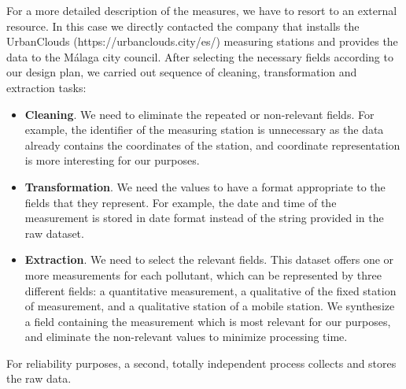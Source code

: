 For a more detailed description of the measures, we have to resort to an external resource.
In this case we directly contacted the company that installs the UrbanClouds (https://urbanclouds.city/es/) measuring stations and provides the data to the Málaga city council.
After selecting the necessary fields according to our design plan, we carried out sequence of cleaning, transformation and extraction tasks:

\begin{itemize}
    \item \textbf{Cleaning}. We need to eliminate the repeated or non-relevant fields.
        For example, the identifier of the measuring station is unnecessary as the data already contains the coordinates of the station, and coordinate representation is more interesting for our purposes.

    \item \textbf{Transformation}. We need the values to have a format appropriate to the fields that they represent.
        For example, the date and time of the measurement is stored in date format instead of the string provided in the raw dataset.

    \item \textbf{Extraction}. We need to select the relevant fields.
        This dataset offers one or more measurements for each pollutant, which can be represented by three different fields:
        a quantitative measurement, a qualitative of the fixed station of measurement, and a qualitative station of a mobile station.
        We synthesize a field containing the measurement which is most relevant for our purposes, and eliminate the non-relevant values to minimize processing time.
\end{itemize}

For reliability purposes, a second, totally independent process collects and stores the raw data.